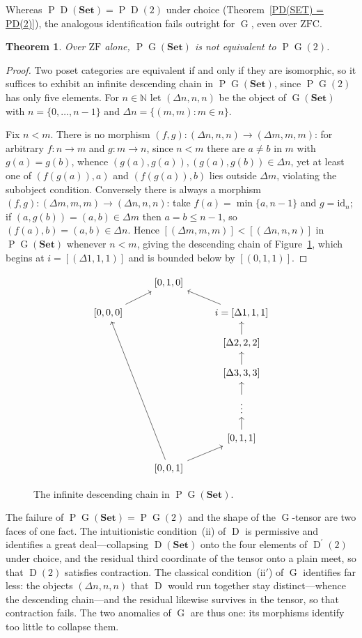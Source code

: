 \documentclass[reqno]{amsart}
\theoremstyle{plain}
\newtheorem{thm}{Theorem}
\theoremstyle{definition}
\newcommand{\Set}{\mathbf{Set}}
\DeclareMathOperator{\D}{D}
\DeclareMathOperator{\G}{G}
\DeclareMathOperator{\PR}{P}
\begin{document}
Whereas $\PR\D(\Set) = \PR\D(2)$ under choice (Theorem~\ref{PD(SET) = PD(2)}), the analogous identification fails outright for $\G$, even over $\mathrm{ZFC}$.
\begin{thm}\label{thm: G Set neq G2}
    Over $\mathrm{ZF}$ alone, $\PR\G(\Set)$ is not equivalent to $\PR\G(2)$.
\end{thm}
\begin{proof}
    Two poset categories are equivalent if and only if they are isomorphic, so it suffices to exhibit an infinite descending chain in $\PR\G(\Set)$, since $\PR\G(2)$ has only five elements. For $n \in \mathbb{N}$ let $(\Delta n, n, n)$ be the object of $\G(\Set)$ with $n = \{0, \ldots, n-1\}$ and $\Delta n = \{(m,m) : m \in n\}$.

    Fix $n < m$. There is no morphism $(f,g) \colon (\Delta n, n, n) \to (\Delta m, m, m)$: for arbitrary $f \colon n \to m$ and $g \colon m \to n$, since $n < m$ there are $a \neq b$ in $m$ with $g(a) = g(b)$, whence $(g(a), g(a)), (g(a), g(b)) \in \Delta n$, yet at least one of $(f(g(a)), a)$ and $(f(g(a)), b)$ lies outside $\Delta m$, violating the subobject condition. Conversely there is always a morphism $(f,g) \colon (\Delta m, m, m) \to (\Delta n, n, n)$: take $f(a) = \min\{a, n-1\}$ and $g = \mathrm{id}_n$; if $(a, g(b)) = (a,b) \in \Delta m$ then $a = b \leq n-1$, so $(f(a), b) = (a,b) \in \Delta n$. Hence $[(\Delta m, m, m)] < [(\Delta n, n, n)]$ in $\PR\G(\Set)$ whenever $n < m$, giving the descending chain of Figure~\ref{fig: G chain}, which begins at $i = [(\Delta 1,1,1)]$ and is bounded below by $[(0,1,1)]$.
\end{proof}
\begin{figure}[h]
$$
\begin{tikzcd}[row sep = scriptsize]
 & {[0,1,0]} &  \\
{[0,0,0]} \ar{ur} &  & i = [\Delta 1,1,1] \ar{ul}   \\
 &  & {[\Delta 2,2,2]} \ar{u} \\
 &  & {[\Delta 3,3,3]} \ar{u} \\
 &  & \vdots \ar{u} \\
 &  & {[0,1,1]} \ar{u} \\
 &  {[0,0,1]} \ar{uuuuul} \ar{ur} &
\end{tikzcd}
$$
\caption{The infinite descending chain in $\PR\G(\Set)$.}\label{fig: G chain}
\end{figure}

The failure of $\PR\G(\Set) = \PR\G(2)$ and the shape of the $\G$-tensor are two faces of one fact. The intuitionistic condition~(ii) of $\D$ is permissive and identifies a great deal---collapsing $\D(\Set)$ onto the four elements of $\D^{\prime}(2)$ under choice, and the residual third coordinate of the tensor onto a plain meet, so that $\D(2)$ satisfies contraction. The classical condition~(ii$'$) of $\G$ identifies far less: the objects $(\Delta n, n, n)$ that $\D$ would run together stay distinct---whence the descending chain---and the residual likewise survives in the tensor, so that contraction fails. The two anomalies of $\G$ are thus one: its morphisms identify too little to collapse them.
\end{document}
